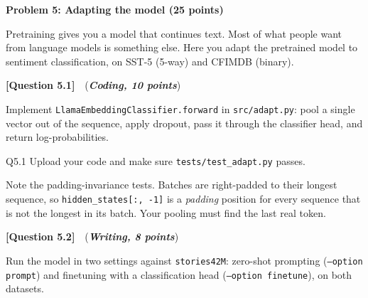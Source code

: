 \documentclass[11pt]{article}
\newcommand{\problem}[1]{%
  \vspace{1em}
  \noindent\colorbox{headerblue}{\parbox{\dimexpr\textwidth-2\fboxsep}{%
    \vspace{2pt}\textbf{\large #1}\vspace{2pt}}}
  \vspace{0.6em}
}
\newcommand{\question}[3]{%
  \vspace{0.9em}
  \noindent\textbf{[Question #1]}\ \ (\textit{\textbf{#2, #3 points}})\quad
}
\begin{document}
\newpage

\problem{Problem 5: Adapting the model (25 points)}

\noindent Pretraining gives you a model that continues text. Most of what people want from language models
is something else. Here you adapt the pretrained model to sentiment classification, on SST-5
(5-way) and CFIMDB (binary).

\question{5.1}{Coding}{10}
Implement \texttt{LlamaEmbeddingClassifier.forward} in \texttt{src/adapt.py}: pool a single vector
out of the sequence, apply dropout, pass it through the classifier head, and return
log-probabilities.

\begin{deliverables}{Q5.1}
Upload your code and make sure \texttt{tests/test\_adapt.py} passes.

\vspace{4pt}
\noindent Note the padding-invariance tests. Batches are right-padded to their longest sequence, so
\texttt{hidden\_states[:, -1]} is a \emph{padding} position for every sequence that is not the
longest in its batch. Your pooling must find the last real token.
\end{deliverables}

\question{5.2}{Writing}{8}
Run the model in two settings against \texttt{stories42M}: zero-shot prompting
(\texttt{--option prompt}) and finetuning with a classification head
(\texttt{--option finetune}), on both datasets.
\end{document}
